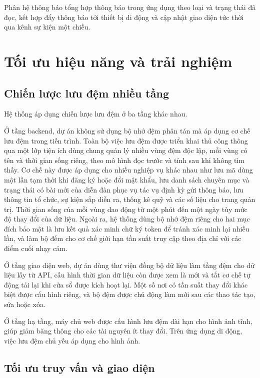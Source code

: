 \documentclass[12pt,a4paper,oneside]{report}
\begin{document}
Phân hệ thông báo tổng hợp thông báo trong ứng dụng theo loại và trạng thái đã đọc, kết hợp đẩy thông báo tới thiết bị di động và cập nhật giao diện tức thời qua kênh sự kiện một chiều.

\section{Tối ưu hiệu năng và trải nghiệm}

\subsection{Chiến lược lưu đệm nhiều tầng}

Hệ thống áp dụng chiến lược lưu đệm ở ba tầng khác nhau.

Ở tầng backend, dự án không sử dụng bộ nhớ đệm phân tán mà áp dụng cơ chế lưu đệm trong tiến trình. Toàn bộ việc lưu đệm được triển khai thủ công thông qua một lớp tiện ích dùng chung quản lý nhiều vùng đệm độc lập, mỗi vùng có tên và thời gian sống riêng, theo mô hình đọc trước và tính sau khi không tìm thấy. Cơ chế này được áp dụng cho nhiều nghiệp vụ khác nhau như lưu mã dùng một lần tạm thời khi đăng ký hoặc đổi mật khẩu, lưu danh sách chuyên mục và trạng thái có bài mới của diễn đàn phục vụ tác vụ định kỳ gửi thông báo, lưu thông tin tổ chức, sự kiện sắp diễn ra, thống kê quỹ và các số liệu cho trang quản trị. Thời gian sống của mỗi vùng dao động từ một phút đến một ngày tùy mức độ thay đổi của dữ liệu. Ngoài ra, hệ thống dùng bộ nhớ đệm riêng cho hai mục đích bảo mật là lưu kết quả xác minh chữ ký token để tránh xác minh lại nhiều lần, và làm bộ đếm cho cơ chế giới hạn tần suất truy cập theo địa chỉ với các điểm cuối nhạy cảm.

Ở tầng giao diện web, dự án dùng thư viện đồng bộ dữ liệu làm tầng đệm cho dữ liệu lấy từ API, cấu hình thời gian dữ liệu còn được xem là mới và tắt cơ chế tự động tải lại khi cửa sổ được kích hoạt lại. Một số nơi có tần suất thay đổi khác biệt được cấu hình riêng, và bộ đệm được chủ động làm mới sau các thao tác tạo, sửa hoặc xóa.

Ở tầng hạ tầng, máy chủ web được cấu hình lưu đệm dài hạn cho hình ảnh tĩnh, giúp giảm băng thông cho các tài nguyên ít thay đổi. Trên ứng dụng di động, việc lưu đệm chủ yếu áp dụng cho hình ảnh.

\subsection{Tối ưu truy vấn và giao diện}
\end{document}
